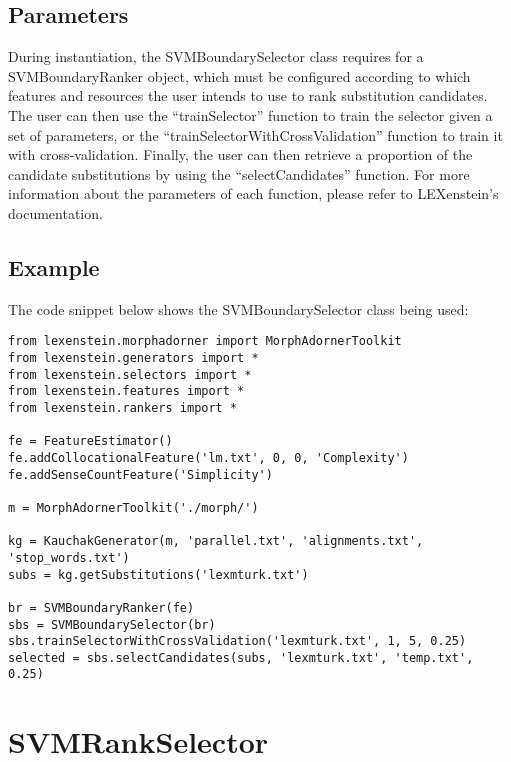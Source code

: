 \subsection{Parameters}

During instantiation, the SVMBoundarySelector class requires for a SVMBoundaryRanker object, which must be configured according to which features and resources the user intends to use to rank substitution candidates. The user can then use the ``trainSelector'' function to train the selector given a set of parameters, or the ``trainSelectorWithCrossValidation'' function to train it with cross-validation. Finally, the user can then retrieve a proportion of the candidate substitutions by using the ``selectCandidates'' function. For more information about the parameters of each function, please refer to LEXenstein's documentation.

\subsection{Example}

The code snippet below shows the SVMBoundarySelector class being used:

\begin{lstlisting}
from lexenstein.morphadorner import MorphAdornerToolkit
from lexenstein.generators import *
from lexenstein.selectors import *
from lexenstein.features import *
from lexenstein.rankers import *

fe = FeatureEstimator()
fe.addCollocationalFeature('lm.txt', 0, 0, 'Complexity')
fe.addSenseCountFeature('Simplicity')

m = MorphAdornerToolkit('./morph/')

kg = KauchakGenerator(m, 'parallel.txt', 'alignments.txt', 'stop_words.txt')
subs = kg.getSubstitutions('lexmturk.txt')

br = SVMBoundaryRanker(fe)
sbs = SVMBoundarySelector(br)
sbs.trainSelectorWithCrossValidation('lexmturk.txt', 1, 5, 0.25)
selected = sbs.selectCandidates(subs, 'lexmturk.txt', 'temp.txt', 0.25)
\end{lstlisting}










\section{SVMRankSelector}

